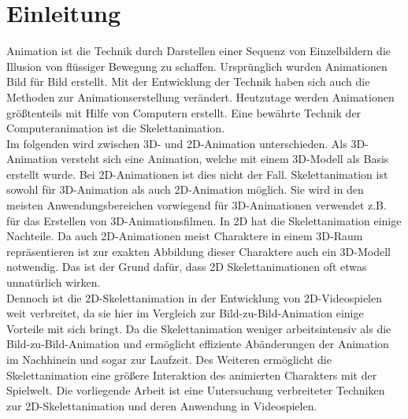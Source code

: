 %
%
%
%
\chapter{Einleitung}
\label{cha:introduction}
%
%
Animation ist die Technik durch Darstellen einer Sequenz von Einzelbildern die Illusion von flüssiger Bewegung zu schaffen. Ursprünglich wurden Animationen Bild für Bild erstellt. Mit der Entwicklung der Technik haben sich auch die Methoden zur Animationserstellung verändert. Heutzutage werden Animationen größtenteils mit Hilfe von Computern erstellt. Eine bewährte Technik der Computeranimation ist die Skelettanimation. \\

Im folgenden wird zwischen 3D- und 2D-Animation unterschieden. Als 3D-Animation versteht sich eine Animation, welche mit einem 3D-Modell als Basis erstellt wurde. Bei 2D-Animationen ist dies nicht der Fall. Skelettanimation ist sowohl für 3D-Animation als auch 2D-Animation möglich. Sie wird in den meisten Anwendungsbereichen vorwiegend für 3D-Animationen verwendet z.B. für das Erstellen von 3D-Animationsfilmen. In 2D hat die Skelettanimation einige Nachteile. Da auch 2D-Animationen meist Charaktere in einem 3D-Raum repräsentieren ist zur exakten Abbildung dieser Charaktere auch ein 3D-Modell notwendig. Das ist der Grund dafür, dass 2D Skelettanimationen oft etwas unnatürlich wirken. \\

Dennoch ist die 2D-Skelettanimation in der Entwicklung von 2D-Videospielen weit verbreitet, da sie hier im Vergleich zur Bild-zu-Bild-Animation einige Vorteile mit sich bringt. Da die Skelettanimation weniger arbeitsintensiv als die Bild-zu-Bild-Animation und ermöglicht effiziente Abänderungen der Animation im Nachhinein und sogar zur Laufzeit. Des Weiteren ermöglicht die Skelettanimation eine größere Interaktion des animierten Charakters mit der Spielwelt. Die vorliegende Arbeit ist eine Untersuchung verbreiteter Techniken zur 2D-Skelettanimation und deren Anwendung in Videospielen. \\
